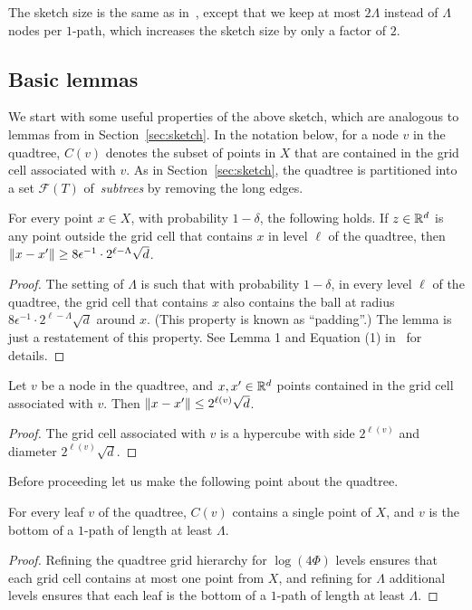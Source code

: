 The sketch size is the same as in~\cite{indyk2017practical}, except that we keep at most $2\Lambda$ instead of $\Lambda$ nodes per $1$-path, which increases the sketch size by only a factor of $2$.

\subsection{Basic lemmas}
We start with some useful properties of the above sketch, which are analogous to lemmas from in Section~\ref{sec:sketch}. In the notation below, for a node $v$ in the quadtree, $C(v)$ denotes the subset of points in $X$ that are contained in the grid cell associated with $v$. As in Section~\ref{sec:sketch}, the quadtree is partitioned into a set $\mathcal F(T)$ of~\emph{subtrees} by removing the long edges.

\begin{lemma}\label{lmm:separation_quadtree}
For every point $x\in X$, with probability $1-\delta$, the following holds.
If $z\in\mathbb R^d$ is any point outside the grid cell that contains $x$ in level $\ell$ of the quadtree, then $\lVert x-x'\rVert\geq 8\epsilon^{-1}\cdot2^{\ell-\Lambda}\sqrt{d}$.
\end{lemma}
\begin{proof}
The setting of $\Lambda$ is such that with probability $1-\delta$, in every level $\ell$ of the quadtree, the grid cell that contains $x$ also contains the ball at radius $8\epsilon^{-1}\cdot2^{\ell-\Lambda}\sqrt{d}$ around $x$. (This property is known as ``padding''.) The lemma is just a restatement of this property.
See Lemma 1 and Equation (1) in~\cite{indyk2017practical} for details.
\end{proof}

\begin{lemma}\label{lmm:samecell}
Let $v$ be a node in the quadtree, and $x,x'\in\mathbb R^d$ points contained in the grid cell associated with $v$. Then $\lVert x-x'\rVert\leq2^{\ell(v)}\sqrt{d}$.
\end{lemma}
\begin{proof}
The grid cell associated with $v$ is a hypercube with side $2^{\ell(v)}$ and diameter $2^{\ell(v)}\sqrt{d}$.
\end{proof}

Before proceeding let us make the following point about the quadtree.
\begin{claim}\label{clm:quadtree_levels}
For every leaf $v$ of the quadtree, $C(v)$ contains a single point of $X$, and $v$ is the bottom of a $1$-path of length at least $\Lambda$.
\end{claim}
\begin{proof}
Refining the quadtree grid hierarchy for $\log(4\Phi)$ levels ensures that each grid cell contains at most one point from $X$, and refining for $\Lambda$ additional levels ensures that each leaf is the bottom of a $1$-path of length at least $\Lambda$.
\end{proof}

